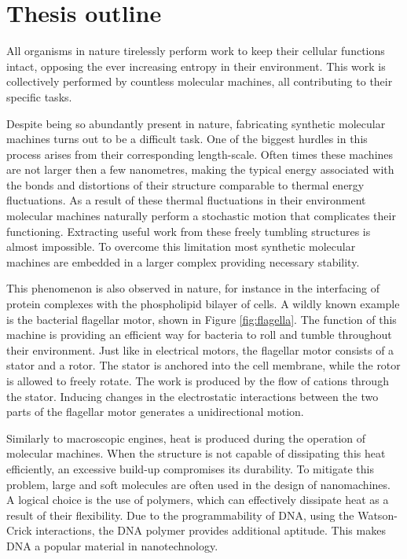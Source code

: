 \section{Thesis outline}

All organisms in nature tirelessly perform work to keep their cellular functions
intact, opposing the ever increasing entropy in their environment. This work is
collectively performed by countless molecular machines, all contributing to
their specific tasks.

Despite being so abundantly present in nature, fabricating synthetic molecular machines
turns out to be a difficult task. One of the biggest hurdles in this process arises from
their corresponding length-scale. Often times these machines are not larger then
a few nanometres, making the typical energy associated with the bonds and
distortions of their structure comparable to thermal energy fluctuations. As a result of
these thermal fluctuations in their environment molecular machines naturally perform
a stochastic motion that complicates their functioning.  Extracting useful work from
these freely tumbling structures is almost impossible. To overcome this limitation most
synthetic molecular machines are embedded in a larger complex providing necessary
stability.\cite{Watson2016}

This phenomenon is also observed in nature, for instance in the interfacing of protein
complexes with the phospholipid bilayer of cells.  A wildly known example is the
bacterial flagellar motor, shown in Figure \ref{fig:flagella}. The function of this
machine is providing an efficient way for bacteria to
roll and tumble throughout their environment. Just like in electrical motors, the
flagellar motor consists of a stator and a rotor. The stator is anchored into the cell
membrane,
while the rotor is allowed to freely rotate. The work is produced by the flow of cations
through the stator. Inducing changes in the electrostatic interactions between the two
parts of the flagellar motor generates a unidirectional motion.\cite{sowa_berry_2008}

Similarly to macroscopic engines, heat is produced during the operation of molecular
machines. When the structure is not capable of dissipating this heat efficiently, an
excessive build-up compromises its durability. To mitigate this problem, large and soft
molecules are often used in the design of nanomachines. A logical choice
is the use of polymers, which can effectively dissipate heat as a result of their
flexibility.  Due to the programmability of DNA, using the Watson-Crick interactions,
the DNA polymer provides additional aptitude. This makes DNA a popular material in
nanotechnology.

